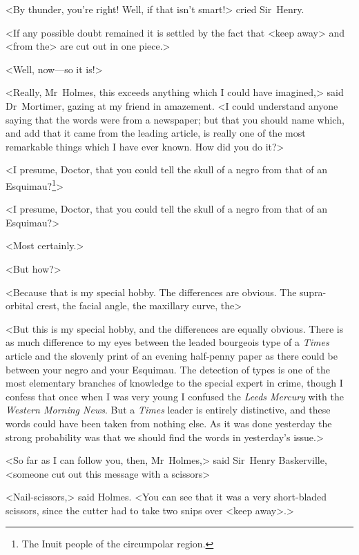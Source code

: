 <By thunder, you're right! Well, if that isn't smart!> cried Sir~Henry.

<If any possible doubt remained it is settled by the fact that <keep away> and <from the> are cut out in one piece.>

<Well, now—so it is!>

<Really, Mr~Holmes, this exceeds anything which I could have imagined,> said Dr~Mortimer, gazing at my friend in amazement. <I could understand anyone saying that the words were from a newspaper; but that you should name which, and add that it came from the leading article, is really one of the most remarkable things which I have ever known. How did you do it?>

\begin{withfootnotes}
<I presume, Doctor, that you could tell the skull of a negro from that of an Esquimau?\footnote{The Inuit people of the circumpolar region.}>
\end{withfootnotes}

\begin{withoutfootnotes}
<I presume, Doctor, that you could tell the skull of a negro from that of an Esquimau?>
\end{withoutfootnotes}

<Most certainly.>

<But how?>

<Because that is my special hobby. The differences are obvious. The supra-orbital crest, the facial angle, the maxillary curve, the\longdash>

<But this is my special hobby, and the differences are equally obvious. There is as much difference to my eyes between the leaded bourgeois type of a \textit{Times} article and the slovenly print of an evening half-penny paper as there could be between your negro and your Esquimau. The detection of types is one of the most elementary branches of knowledge to the special expert in crime, though I confess that once when I was very young I confused the \textit{Leeds Mercury} with the \textit{Western Morning News}. But a \textit{Times} leader is entirely distinctive, and these words could have been taken from nothing else. As it was done yesterday the strong probability was that we should find the words in yesterday's issue.>

<So far as I can follow you, then, Mr~Holmes,> said Sir~Henry Baskerville, <someone cut out this message with a scissors\longdash>

<Nail-scissors,> said Holmes. <You can see that it was a very short-bladed scissors, since the cutter had to take two snips over <keep away>.>

